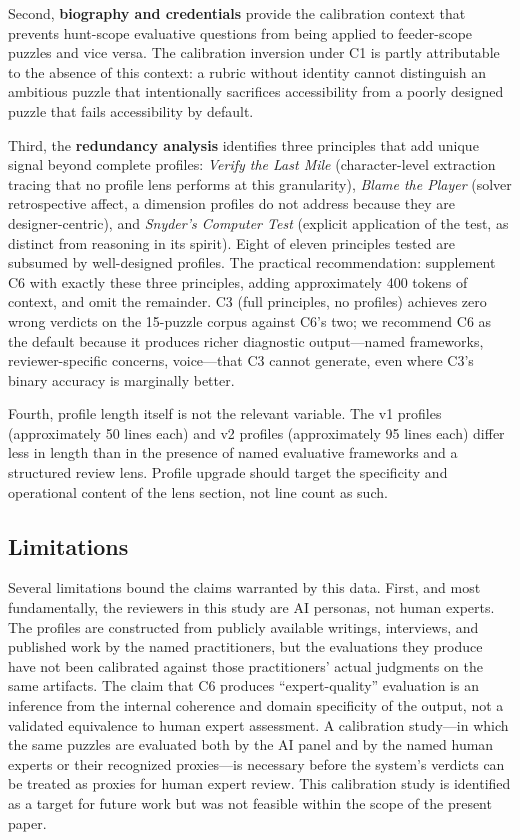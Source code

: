 Second, \textbf{biography and credentials} provide the calibration context that prevents
hunt-scope evaluative questions from being applied to feeder-scope puzzles and vice versa.
The calibration inversion under C1 is partly attributable to the absence of this context:
a rubric without identity cannot distinguish an ambitious puzzle that intentionally
sacrifices accessibility from a poorly designed puzzle that fails accessibility by default.

Third, the \textbf{redundancy analysis} identifies three principles that add unique signal
beyond complete profiles: \emph{Verify the Last Mile} (character-level extraction tracing
that no profile lens performs at this granularity), \emph{Blame the Player} (solver
retrospective affect, a dimension profiles do not address because they are designer-centric),
and \emph{Snyder's Computer Test} (explicit application of the test, as distinct from
reasoning in its spirit). Eight of eleven principles tested are subsumed by well-designed
profiles. The practical recommendation: supplement C6 with exactly these three principles,
adding approximately 400 tokens of context, and omit the remainder. C3 (full principles,
no profiles) achieves zero wrong verdicts on the 15-puzzle corpus against C6's two; we
recommend C6 as the default because it produces richer diagnostic output---named frameworks,
reviewer-specific concerns, voice---that C3 cannot generate, even where C3's binary accuracy
is marginally better.

Fourth, profile length itself is not the relevant variable. The v1 profiles (approximately
50 lines each) and v2 profiles (approximately 95 lines each) differ less in length than in
the presence of named evaluative frameworks and a structured review lens. Profile upgrade
should target the specificity and operational content of the lens section, not line count as
such.

\subsection{Limitations}
\label{sec:limitations}

Several limitations bound the claims warranted by this data. First, and most fundamentally,
the reviewers in this study are AI personas, not human experts. The profiles are constructed
from publicly available writings, interviews, and published work by the named practitioners,
but the evaluations they produce have not been calibrated against those practitioners' actual
judgments on the same artifacts. The claim that C6 produces ``expert-quality'' evaluation is
an inference from the internal coherence and domain specificity of the output, not a validated
equivalence to human expert assessment. A calibration study---in which the same puzzles are
evaluated both by the AI panel and by the named human experts or their recognized proxies---is
necessary before the system's verdicts can be treated as proxies for human expert review. This
calibration study is identified as a target for future work but was not feasible within the
scope of the present paper.

